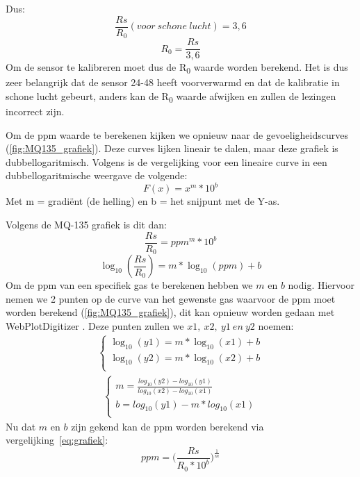 Dus:
\begin{equation}
    \frac{Rs}{R_0}(voor\ schone\ lucht) = 3,6
\end{equation}
\begin{equation}
    R_0 = \frac{Rs}{3,6}
\end{equation}
Om de sensor te kalibreren moet dus de R\textsubscript{0} waarde worden berekend. Het is dus zeer belangrijk dat de sensor 24-48 heeft voorverwarmd en dat de kalibratie in schone lucht gebeurt, anders kan de R\textsubscript{0} waarde afwijken en zullen de lezingen incorrect zijn.

Om de ppm waarde te berekenen kijken we opnieuw naar de gevoeligheidscurves (\ref{fig:MQ135_grafiek}). Deze curves lijken lineair te dalen, maar deze grafiek is dubbellogaritmisch. Volgens \textcite{loglog2024} is de vergelijking voor een lineaire curve in een dubbellogaritmische weergave de volgende:
\begin{equation}
    F(x) = x^{m} * 10^{b}
\end{equation}
Met m = gradiënt (de helling) en b = het snijpunt met de Y-as.

Volgens de MQ-135 grafiek is dit dan:
\begin{equation}
    \label{eq:grafiek}
    \frac{Rs}{R_0} = ppm^{m} * 10^{b}
\end{equation}
\begin{equation}
    \log_{10} (\frac{Rs}{R_0}) = m * \log_{10} (ppm) + b
\end{equation}
Om de ppm van een specifiek gas te berekenen hebben we $m$ en $b$ nodig. Hiervoor nemen we 2 punten op de curve van het gewenste gas waarvoor de ppm moet worden berekend (\ref{fig:MQ135_grafiek}), dit kan opnieuw worden gedaan met WebPlotDigitizer \autocite{Rohatgi2024}. Deze punten zullen we $x1,\ x2,\ y1\ en\ y2$ noemen:
\begin{eqnarray}
    \begin{cases}
        \log_{10} (y1) = m * \log_{10} (x1) + b\\
        \log_{10} (y2) = m * \log_{10} (x2) + b\\
    \end{cases}
\end{eqnarray}
\begin{eqnarray}
    \begin{cases}
        m = \frac{log_{10} (y2) - log_{10} (y1)}{log_{10} (x2) - log_{10} (x1)} \\
        b = log_{10} (y1) - m * log_{10} (x1)\\
    \end{cases}
\end{eqnarray}
Nu dat $m$ en $b$ zijn gekend kan de ppm worden berekend via vergelijking~\ref{eq:grafiek}:
\begin{equation}
    ppm = \Big(\frac{Rs}{R_0 * 10^{b}}\Big)^{\frac{1}{m}}
\end{equation}

